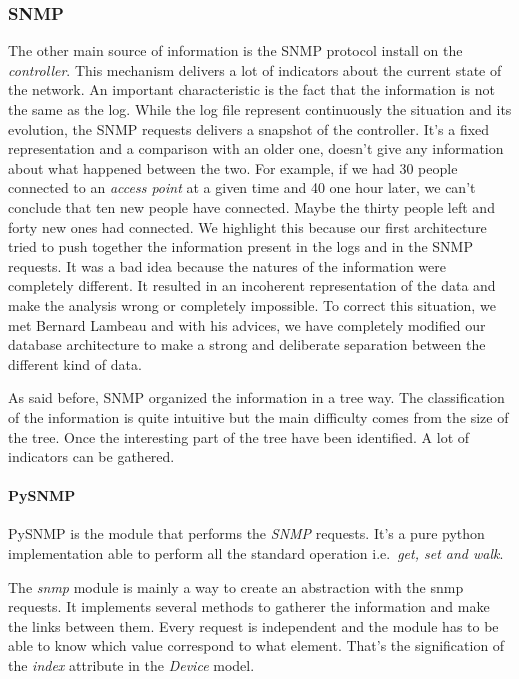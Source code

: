 \subsubsection{SNMP}
The other main source of information is the SNMP protocol install on the \emph{controller}. This mechanism delivers a lot of indicators about the current state of the network. An important characteristic is the fact that the information is not the same as the log. While the log file represent continuously the situation and its evolution, the SNMP requests delivers a snapshot of the controller. It's a fixed representation and a comparison with an older one, doesn't give any information about what happened between the two. For example, if we had 30 people connected to an \emph{access point} at a given time and 40 one hour later, we can't conclude that ten new people have connected. Maybe the thirty people left and forty new ones had connected. We highlight this because our first architecture tried to push together the information present in the logs and in the SNMP requests. It was a bad idea because the natures of the information were completely different. It resulted in an incoherent representation of the data and make the analysis wrong or completely impossible. To correct this situation, we met Bernard Lambeau and with his advices, we have completely modified our database architecture to make a strong and deliberate separation between the different kind of data.

As said before, SNMP organized the information in a tree way. The classification of the information is quite intuitive but the main difficulty comes from the size of the tree. Once the interesting part of the tree have been identified. A lot of indicators can be gathered.

\paragraph{PySNMP} PySNMP is the module that performs the \emph{SNMP} requests. It's a pure python implementation able to perform all the standard operation i.e.\  \emph{get, set and walk}.

The \emph{snmp} module is mainly a way to create an abstraction with the snmp requests. It implements several methods to gatherer the information and make the links between them. Every request is independent and the module has to be able to know which value correspond to what element. That's the signification of the \emph{index} attribute in the \emph{Device} model.

